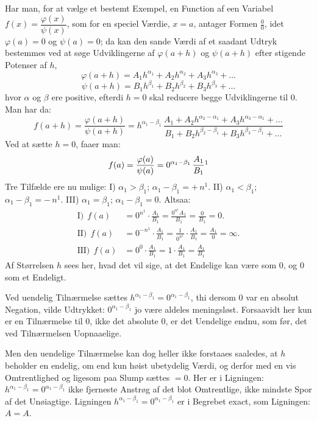 \documentclass[12pt]{book}
\newcommand{\opage}[1]{\marginnote{\footnotesize\textit{[#1]}}}
\begin{document}
Har man, for at vælge et bestemt Exempel, en Function af een Variabel
$f(x) = \dfrac{\varphi(x)}{\psi(x)}$, som for en speciel Værdie, $x = a$, antager
Formen $\frac{0}{0}$, idet $\varphi(a) = 0$ og $\psi(a) = 0$; da kan den sande
Værdi af et saadant Udtryk bestemmes ved at søge Udviklingerne af $\varphi(a+h)$
og $\psi(a+h)$ efter stigende Potenser af $h$,
\[
\varphi(a+h) = A_1 h^{\alpha_1} + A_2 h^{\alpha_2} + A_3 h^{\alpha_3} + \dots
\]
\[
\psi(a+h) = B_1 h^{\beta_1} + B_2 h^{\beta_2} + B_3 h^{\beta_3} + \dots
\]
hvor $\alpha$ og $\beta$ ere positive, efterdi $h = 0$ skal reducere begge
Udviklingerne til 0. Man har da:
\opage{52} \[
f(a+h) = \frac{\varphi(a+h)}{\psi(a+h)} = h^{\alpha_1-\beta_1}\,
\frac{A_1 + A_2 h^{\alpha_2-\alpha_1} + A_3 h^{\alpha_3-\alpha_1} + \dots}
     {B_1 + B_2 h^{\beta_2-\beta_1} + B_3 h^{\beta_3-\beta_1} + \dots}
\]
Ved at sætte $h = 0$, faaer man:
\[
f(a) = \frac{\varphi(a)}{\psi(a)} = 0^{\alpha_1-\beta_1}\,\frac{A_1}{B_1}\footnotemark
\]
Tre Tilfælde ere nu mulige: I) $\alpha_1 > \beta_1$; $\alpha_1 - \beta_1 = +\,n^{1}$.
II) $\alpha_1 < \beta_1$; $\alpha_1 - \beta_1 = -\,n^{1}$. III) $\alpha_1 = \beta_1$;
$\alpha_1 - \beta_1 = 0$. Altsaa:
\begin{align*}
\text{I)}\ \ f(a) &= 0^{n^{1}}\cdot\frac{A_1}{B_1} = \frac{0^{n^{1}}A_1}{B_1}
   = \frac{0}{B_1} = 0.\\
\text{II)}\ \ f(a) &= 0^{-n^{1}}\cdot\frac{A_1}{B_1}
   = \frac{1}{0^{n^{1}}}\cdot\frac{A_1}{B_1} = \frac{A_1}{0} = \infty.\\
\text{III)}\ \ f(a) &= 0^{0}\cdot\frac{A_1}{B_1} = 1\cdot\frac{A_1}{B_1}
   = \frac{A_1}{B_1}
\end{align*}
Af Størrelsen $h$ sees her, hvad det vil sige, at det Endelige kan være som 0, og
0 som et Endeligt.

Ved uendelig Tilnærmelse sættes $h^{\alpha_1-\beta_1} = 0^{\alpha_1-\beta_1}$, thi
dersom 0 var en absolut Negation, vilde Udtrykket: $0^{\alpha_1-\beta_1}$ jo være
aldeles meningsløst. Forsaavidt her kun er en Tilnærmelse til 0, ikke det absolute
0, er det Uendelige endnu, som før, det ved Tilnærmelsen Uopnaaelige.

Men den uendelige Tilnærmelse kan dog heller ikke forstaaes saaledes, at $h$
beholder en endelig, om end kun høist ubetydelig Værdi, og derfor med en vis
Omtrentlighed og ligesom paa Slump sættes $= 0$. Her er i Ligningen:
$h^{\alpha_1-\beta_1} = 0^{\alpha_1-\beta_1}$ ikke fjerneste Anstrøg af det blot
Omtrentlige, ikke mindste Spor af det Unøiagtige. Ligningen
$h^{\alpha_1-\beta_1} = 0^{\alpha_1-\beta_1}$ er i Begrebet exact, som Ligningen:
$A = A$.
\end{document}
